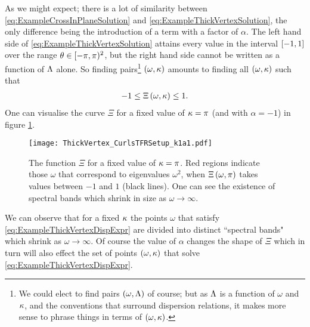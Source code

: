 As we might expect; there is a lot of similarity between \eqref{eq:ExampleCrossInPlaneSolution} and \eqref{eq:ExampleThickVertexSolution}, the only difference being the introduction of a term with a factor of $\alpha$.
The left hand side of \eqref{eq:ExampleThickVertexSolution} attains every value in the interval $\left[ -1,1 \right]$ over the range $\theta\in[-\pi,\pi)^2$, but the right hand side cannot be written as a function of $\Lambda$ alone.
So finding pairs\footnote{We could elect to find pairs $\left( \omega, \Lambda \right)$ of course; but as $\Lambda$ is a function of $\omega$ and $\kappa$, and the conventions that surround dispersion relations, it makes more sense to phrase things in terms of $\left( \omega, \kappa \right)$.} $\left( \omega, \kappa \right)$ amounts to finding all $\left( \omega, \kappa \right)$ such that
\begin{align} \label{eq:ExampleThickVertexDispExpr}
	-1 \leq \Xi\left( \omega, \kappa \right) \leq 1.
\end{align}
One can visualise the curve $\Xi$ for a fixed value of $\kappa=\pi$ (and with $\alpha=-1$) in figure \ref{fig:ThickVertex_CurlsTFRSetup_k1a1}.
\begin{figure}[t]
	\centering
	\texttt{[image: ThickVertex\_CurlsTFRSetup\_k1a1.pdf]}
	\caption{\label{fig:ThickVertex_CurlsTFRSetup_k1a1} The function $\Xi$ for a fixed value of $\kappa=\pi$. Red regions indicate those $\omega$ that correspond to eigenvalues $\omega^2$, when $\Xi\left( \omega, \pi \right)$ takes values between $-1$ and $1$ (black lines). One can see the existence of spectral bands which shrink in size as $\omega\rightarrow\infty$.}
\end{figure}
We can observe that for a fixed $\kappa$ the points $\omega$ that satisfy \eqref{eq:ExampleThickVertexDispExpr} are divided into distinct ``spectral bands" which shrink as $\omega\rightarrow\infty$.
Of course the value of $\alpha$ changes the shape of $\Xi$ which in turn will also effect the set of points $\left( \omega, \kappa \right)$ that solve \eqref{eq:ExampleThickVertexDispExpr}. \newline

